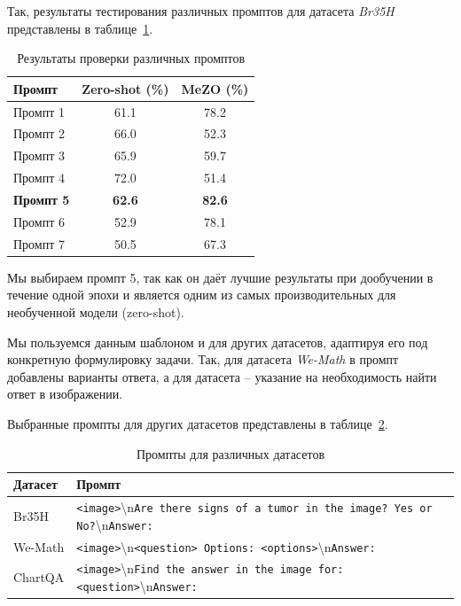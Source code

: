\documentclass[LI,KR]{HSEUniversity}
\begin{document}
Так, результаты тестирования различных промптов для датасета \textit{Br35H} представлены в таблице~\ref{tab:prompt-engineering-results}.

\begin{table}[H]
\centering
\begin{tabular}{|l|c|c|}
\hline
\textbf{Промпт} & \textbf{Zero-shot (\%)} & \textbf{MeZO (\%)} \\ \hline
Промпт 1 & 61.1 & 78.2 \\ \hline
Промпт 2 & 66.0 & 52.3 \\ \hline
Промпт 3 & 65.9 & 59.7 \\ \hline
Промпт 4 & 72.0 & 51.4 \\ \hline
\textbf{Промпт 5} & \textbf{62.6} & \textbf{82.6} \\ \hline
Промпт 6 & 52.9 & 78.1 \\ \hline
Промпт 7 & 50.5 & 67.3 \\ \hline
\end{tabular}
\caption{Результаты проверки различных промптов}
\label{tab:prompt-engineering-results}
\end{table}

Мы выбираем промпт 5, так как он даёт лучшие результаты при дообучении в течение одной эпохи и является одним из самых производительных для необученной модели (zero-shot).

Мы пользуемся данным шаблоном и для других датасетов, адаптируя его под конкретную формулировку задачи.
Так, для датасета \textit{We-Math} в промпт добавлены варианты ответа,
а для датасета  – указание на необходимость найти ответ в изображении.

Выбранные промпты для других датасетов представлены в таблице~\ref{tab:prompts-datasets}.

\begin{table}[H]
\centering
\begin{tabular}{|l|l|}
\hline
\textbf{Датасет} & \textbf{Промпт} \\ \hline
Br35H & \small{\texttt{<image>}\textbackslash n\texttt{Are there signs of a tumor in the image? Yes or No?}\textbackslash n\texttt{Answer:}} \\ \hline
We-Math & \small{\texttt{<image>}\textbackslash n\texttt{<question> Options: <options>}\textbackslash n\texttt{Answer:}} \\ \hline
ChartQA & \small{\texttt{<image>}\textbackslash n\texttt{Find the answer in the image for: <question>}\textbackslash n\texttt{Answer:}} \\ \hline
\end{tabular}
\caption{Промпты для различных датасетов}
\label{tab:prompts-datasets}
\end{table}
\end{document}

